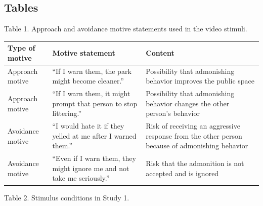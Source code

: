 \documentclass[
]{article}
\newcounter{none} %
\begin{document}
\subsection{Tables}\label{tables}

Table 1. Approach and avoidance motive statements used in the video
stimuli.

{\def\LTcaptype{none} %
\begin{longtable}[]{@{}
  >{\raggedright\arraybackslash}p{}
  >{\raggedright\arraybackslash}p{}
  >{\raggedright\arraybackslash}p{}@{}}
\toprule\noalign{}
\begin{minipage}[b]{\linewidth}\raggedright
Type of motive
\end{minipage} & \begin{minipage}[b]{\linewidth}\raggedright
Motive statement
\end{minipage} & \begin{minipage}[b]{\linewidth}\raggedright
Content
\end{minipage} \\
\midrule\noalign{}
\endhead
\bottomrule\noalign{}
\endlastfoot
Approach motive & ``If I warn them, the park might become cleaner.'' &
Possibility that admonishing behavior improves the public space \\
Approach motive & ``If I warn them, it might prompt that person to stop
littering.'' & Possibility that admonishing behavior changes the other
person's behavior \\
Avoidance motive & ``I would hate it if they yelled at me after I warned
them.'' & Risk of receiving an aggressive response from the other person
because of admonishing behavior \\
Avoidance motive & ``Even if I warn them, they might ignore me and not
take me seriously.'' & Risk that the admonition is not accepted and is
ignored \\
\end{longtable}
}

Table 2. Stimulus conditions in Study 1.
\end{document}
